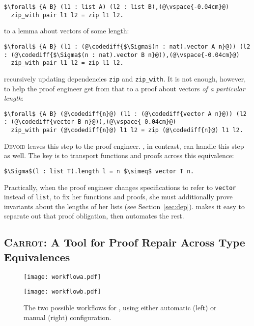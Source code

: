 \begin{lstlisting}
$\forall$ {A B} (l1 : list A) (l2 : list B),(@\vspace{-0.04cm}@)
  zip_with pair l1 l2 = zip l1 l2.
\end{lstlisting}
to a lemma about vectors of some length:

\begin{lstlisting}
$\forall$ {A B} (l1 : (@\codediff{$\Sigma$(n : nat).vector A n}@)) (l2 : (@\codediff{$\Sigma$(n : nat).vector B n}@)),(@\vspace{-0.04cm}@)
  zip_with pair l1 l2 = zip l1 l2.
\end{lstlisting}
recursively updating dependencies \lstinline{zip} and \lstinline{zip_with}.
It is not enough, however, to help the proof engineer get from that to a proof about vectors \textit{of a particular length}:

\begin{lstlisting}
$\forall$ {A B} (@\codediff{n}@) (l1 : (@\codediff{vector A n}@)) (l2 : (@\codediff{vector B n}@)),(@\vspace{-0.04cm}@)
  zip_with pair (@\codediff{n}@) l1 l2 = zip (@\codediff{n}@) l1 l2.
\end{lstlisting}

\textsc{Devoid} leaves this step to the proof engineer.
\toolname, in contrast, can handle this step as well.
The key is to transport functions and proofs across this equivalence:

\begin{lstlisting}
$\Sigma$(l : list T).length l = n $\simeq$ vector T n.
\end{lstlisting}
Practically, when the proof engineer changes specifications to refer to \lstinline{vector} instead of \lstinline{list},
to fix her functions and proofs, she must additionally prove invariants about the lengths of her lists (see Section~\ref{sec:dep}).
\toolname makes it easy to separate out that proof obligation, then automates the rest.

\subsection{\textsc{Carrot}: A Tool for Proof Repair Across Type Equivalences}
\label{sec:time}

\begin{figure}
\begin{minipage}{0.52\textwidth}
\texttt{[image: workflowa.pdf]}
\end{minipage}
\hfill
\begin{minipage}{0.45\textwidth}
\texttt{[image: workflowb.pdf]}
\vspace{0.97cm}
\end{minipage}
\vspace{-0.4cm}
\caption{The two possible workflows for \toolname, using either automatic (left) or manual (right) configuration.}
\label{fig:system}
\end{figure}

